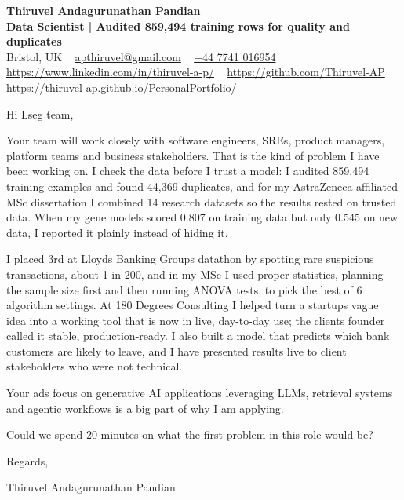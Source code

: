 \documentclass[11pt,a4paper]{article}
\newcommand{\num}[1]{\textbf{#1}}   %
\begin{document}
\raggedright
\pagestyle{empty}

\begin{center}
    {\LARGE \color{linkblue} \textbf{Thiruvel Andagurunathan Pandian}}\\[0.2cm]
    {\color{headernavy}\small\textbf{Data Scientist | Audited \num{859,494} training rows for quality and duplicates}}\\[0.2cm]
    {\small Bristol, UK\nobreak\ \,\textbar\, \href{mailto:apthiruvel@gmail.com}{apthiruvel@gmail.com}\nobreak\ \,\textbar\, \href{tel:+447741016954}{+44 7741 016954}\nobreak\ \,\textbar\, \href{https://www.linkedin.com/in/thiruvel-a-p/}{https://www.linkedin.com/in/thiruvel-a-p/}\nobreak\ \,\textbar\, \href{https://github.com/Thiruvel-AP}{https://github.com/Thiruvel-AP}\nobreak\ \,\textbar\, \href{https://thiruvel-ap.github.io/PersonalPortfolio/}{https://thiruvel-ap.github.io/PersonalPortfolio/}}

\end{center}

\vspace{0.4cm}

\noindent
Hi Lseg team,

Your team will work closely with software engineers, SREs, product managers, platform teams and business stakeholders. That is the kind of problem I have been working on. I check the data before I trust a model: I audited 859,494 training examples and found 44,369 duplicates, and for my AstraZeneca-affiliated MSc dissertation I combined 14 research datasets so the results rested on trusted data. When my gene models scored 0.807 on training data but only 0.545 on new data, I reported it plainly instead of hiding it.

I placed 3rd at Lloyd\textquotesingle{}s Banking Group\textquotesingle{}s datathon by spotting rare suspicious transactions, about 1 in 200, and in my MSc I used proper statistics, planning the sample size first and then running ANOVA tests, to pick the best of 6 algorithm settings. At 180 Degrees Consulting I helped turn a startup\textquotesingle{}s vague idea into a working tool that is now in live, day-to-day use; the client\textquotesingle{}s founder called it \textquotedbl{}stable, production-ready\textquotedbl{}. I also built a model that predicts which bank customers are likely to leave, and I have presented results live to client stakeholders who were not technical.

Your ad\textquotesingle{}s focus on generative AI applications leveraging LLMs, retrieval systems and agentic workflows is a big part of why I am applying.

Could we spend 20 minutes on what the first problem in this role would be?

\vspace{0.5cm}

Regards,

Thiruvel Andagurunathan Pandian
\end{document}
